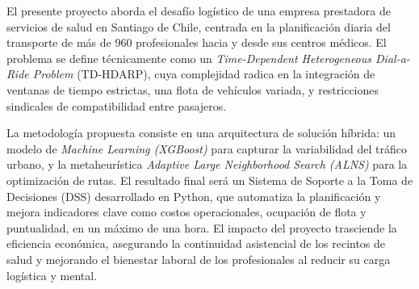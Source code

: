 El presente proyecto aborda el desafío logístico de una empresa prestadora de servicios de salud en Santiago de Chile, centrada en la planificación diaria del transporte de más de 960 profesionales hacia y desde sus centros médicos. El problema se define técnicamente como un \textit{Time-Dependent Heterogeneous Dial-a-Ride Problem} (TD-HDARP), cuya complejidad radica en la integración de ventanas de tiempo estrictas, una flota de vehículos variada, y restricciones sindicales de compatibilidad entre pasajeros.

La metodología propuesta consiste en una arquitectura de solución híbrida: un modelo de \textit{Machine Learning (XGBoost)} para capturar la variabilidad del tráfico urbano, y la metaheurística \textit{Adaptive Large Neighborhood Search (ALNS)} para la optimización de rutas. El resultado final será un Sistema de Soporte a la Toma de Decisiones (DSS) desarrollado en Python, que automatiza la planificación y mejora indicadores clave como costos operacionales, ocupación de flota y puntualidad, en un máximo de una hora. El impacto del proyecto trasciende la eficiencia económica, asegurando la continuidad asistencial de los recintos de salud y mejorando el bienestar laboral de los profesionales al reducir su carga logística y mental.